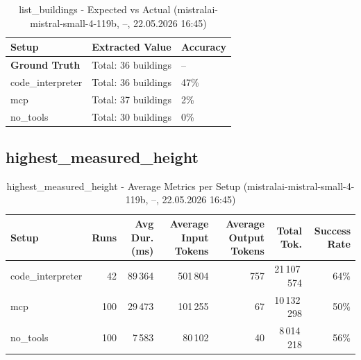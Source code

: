\documentclass[a4paper,11pt]{article}
\begin{document}
\begin{table}[H]
\centering
\scriptsize
\caption{list\_buildings - Expected vs Actual (mistralai-mistral-small-4-119b, --, 22.05.2026 16:45)}
\begin{tabular}{l l l}
\toprule
Setup & Extracted Value & Accuracy \\
\midrule
\textbf{Ground Truth} & Total: 36 buildings & -- \\
\midrule
code\_interpreter & Total: 36 buildings & 47\% \\
mcp & Total: 37 buildings & 2\% \\
no\_tools & Total: 30 buildings & 0\% \\
\bottomrule
\end{tabular}
\end{table}

\clearpage

\subsection{highest\_measured\_height}

\begin{table}[H]
\centering
\scriptsize
\caption{highest\_measured\_height - Average Metrics per Setup (mistralai-mistral-small-4-119b, --, 22.05.2026 16:45)}
\label{tab:combined\_highest\_measured\_height\_metrics\_20260522}
\begin{tabular}{l r r r r r r}
\toprule
Setup & Runs & Avg Dur. (ms) & Average Input Tokens & Average Output Tokens & Total Tok. & Success Rate \\
\midrule
code\_interpreter & 42 & 89\,364 & 501\,804 & 757 & 21\,107\,574 & 64\% \\
mcp & 100 & 29\,473 & 101\,255 & 67 & 10\,132\,298 & 50\% \\
no\_tools & 100 & 7\,583 & 80\,102 & 40 & 8\,014\,218 & 56\% \\
\bottomrule
\end{tabular}
\end{table}
\end{document}
